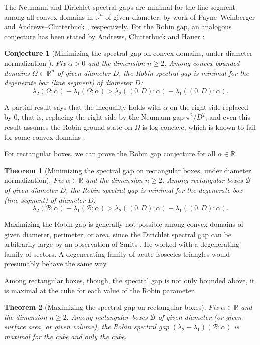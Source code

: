 \documentclass[12pt,reqno]{amsart}
\newtheorem{theorem}{Theorem}[section]
\newtheorem{conjx}{Conjecture}
\theoremstyle{definition}
\newcommand{\R}{{\mathbb R}}
\newcommand{\Rn}{{\mathbb R}^n}
\begin{document}
The Neumann and Dirichlet spectral gaps are minimal for the line segment among all convex domains in $\Rn$ of given diameter, by work of Payne--Weinberger \cite{PW60} and Andrews--Clutterbuck \cite{AC11}, respectively. For the Robin gap, an analogous conjecture has been stated by Andrews, Clutterbuck and Hauer \cite{ACH18}: 
%
\begin{conjx}[Minimizing the spectral gap on convex domains, under diameter normalization ]\label{robingap} Fix $\alpha > 0$ and the dimension $n \geq 2$. Among convex bounded domains $\Omega \subset \Rn$ of given diameter $D$, the Robin spectral gap is minimal for the degenerate box (line segment) of diameter $D$: 
\[
\lambda_2(\Omega;\alpha)-\lambda_1(\Omega;\alpha) > \lambda_2((0,D);\alpha)-\lambda_1((0,D);\alpha) .
\]
\end{conjx}
%
A partial result \cite[Theorem 2.1]{ACH18} says that the inequality holds with $\alpha$ on the right side replaced by $0$, that is, replacing the right side by the Neumann gap $\pi^2/D^2$; and even this result assumes the Robin ground state on $\Omega$ is log-concave, which is known to fail for some convex domains \cite[Theorem 1.2]{ACH18}. 

For rectangular boxes, we can prove the Robin gap conjecture for all $\alpha \in \R$.
%
\begin{theorem}[Minimizing the spectral gap on rectangular boxes, under diameter normalization]\label{gapD} Fix $\alpha \in \R$ and the dimension $n \geq 2$. Among rectangular boxes $\mathcal{B}$ of given diameter $D$, the Robin spectral gap is minimal for the degenerate box (line segment) of diameter $D$: 
\[
\lambda_2(\mathcal{B};\alpha)-\lambda_1(\mathcal{B};\alpha) > \lambda_2((0,D);\alpha)-\lambda_1((0,D);\alpha) .
\]
\end{theorem}
%

Maximizing the Robin gap is generally not possible among convex domains of given diameter, perimeter, or area, since the Dirichlet spectral gap can be arbitrarily large by an observation of Smits \cite[Theorem 5 and discussion]{Sm96}. He worked with a degenerating family of sectors. A degenerating family of acute isosceles triangles would presumably behave the same way. 

Among rectangular boxes, though, the spectral gap is not only bounded above, it is maximal at the cube for each value of the Robin parameter. 
%
\begin{theorem}[Maximizing the spectral gap on rectangular boxes]\label{gapSV} Fix $\alpha \in \R$ and the dimension $n \geq 2$. Among rectangular boxes $\mathcal{B}$ of given diameter (or given surface area, or given volume), the Robin spectral gap $(\lambda_2-\lambda_1)(\mathcal{B};\alpha)$ is maximal for the cube and only the cube.  
\end{theorem}
%
\end{document}
